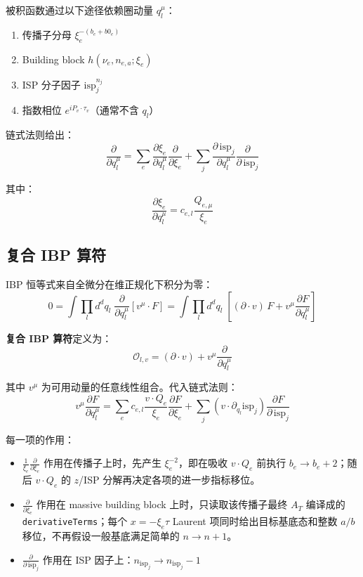 ﻿\documentclass[a4paper,11pt]{article}
\begin{document}
被积函数通过以下途径依赖圈动量 $q_l^\mu$：
\begin{enumerate}
  \item 传播子分母 $\xi_e^{-(b_e + b0_e)}$
  \item Building block $h(\nu_e, n_{e,a}; \xi_e)$
  \item ISP 分子因子 $\text{isp}_j^{n_j}$
  \item 指数相位 $e^{i P_v \cdot \tau_v}$（通常不含 $q_l$）
\end{enumerate}

链式法则给出：
\begin{equation}
  \frac{\partial}{\partial q_l^\mu} = \sum_e \frac{\partial \xi_e}{\partial q_l^\mu} \frac{\partial}{\partial \xi_e} + \sum_j \frac{\partial\, \text{isp}_j}{\partial q_l^\mu} \frac{\partial}{\partial\, \text{isp}_j}
\end{equation}

其中：
\begin{equation}
  \frac{\partial \xi_e}{\partial q_l^\mu} = c_{e,l} \frac{Q_{e,\mu}}{\xi_e}
\end{equation}

\subsection{复合 IBP 算符}

IBP 恒等式来自全微分在维正规化下积分为零：
\begin{equation}
  0 = \int \prod_l d^d q_l\; \frac{\partial}{\partial q_l^\mu} \left[ v^\mu \cdot F \right] = \int \prod_l d^d q_l\; \left[ (\partial \cdot v)\, F + v^\mu \frac{\partial F}{\partial q_l^\mu} \right]
\end{equation}

\textbf{复合 IBP 算符}定义为：
\begin{equation}
  \mathcal{O}_{l,v} = (\partial \cdot v) + v^\mu \frac{\partial}{\partial q_l^\mu}
\end{equation}

其中 $v^\mu$ 为可用动量的任意线性组合。代入链式法则：
\begin{equation}
  v^\mu \frac{\partial F}{\partial q_l^\mu} = \sum_e c_{e,l} \frac{v \cdot Q_e}{\xi_e} \frac{\partial F}{\partial \xi_e} + \sum_j (v \cdot \partial_{q_l} \text{isp}_j) \frac{\partial F}{\partial\, \text{isp}_j}
\end{equation}

每一项的作用：
\begin{itemize}
  \item $\frac{1}{\xi_e}\frac{\partial}{\partial \xi_e}$ 作用在传播子上时，先产生 $\xi_e^{-2}$，即在吸收 $v\cdot Q_e$ 前执行 $b_e\to b_e+2$；随后 $v\cdot Q_e$ 的 $z$/ISP 分解再决定各项的进一步指标移位。
  \item $\frac{\partial}{\partial \xi_e}$ 作用在 massive building block 上时，只读取该传播子最终 $A_T$ 编译成的 \texttt{derivativeTerms}；每个 $x=-\xi_e\tau$ Laurent 项同时给出目标基底态和整数 $a/b$ 移位，不再假设一般基底满足简单的 $n\to n+1$。
  \item $\frac{\partial}{\partial\, \text{isp}_j}$ 作用在 ISP 因子上：$n_{\text{isp}_j} \to n_{\text{isp}_j} - 1$
\end{itemize}
\end{document}
